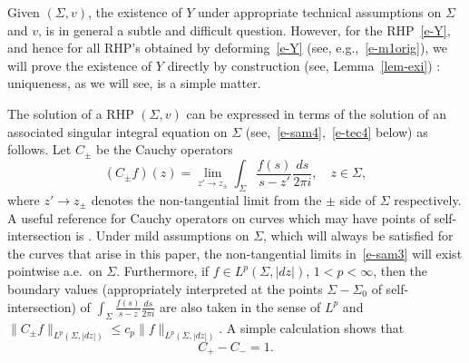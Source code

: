 \documentclass{amsart}
\theoremstyle{definition}
\theoremstyle{remark}
\numberwithin{equation}{section}
\begin{document}
Given $(\Sigma,v)$, the existence of $Y$ under appropriate 
technical assumptions on $\Sigma$ and $v$, is in general 
a subtle and difficult question.
However, for the RHP~\eqref{e-Y}, and hence for all RHP's obtained by 
deforming~\eqref{e-Y} (see, e.g.,~\eqref{e-m1orig}), we will prove the 
existence of $Y$ directly by construction (see, Lemma~\ref{lem-exi}) : 
uniqueness, as we will see, is a simple matter.

The solution of a RHP $(\Sigma, v)$ can be expressed in terms of 
the solution of an associated singular integral equation on $\Sigma$ 
(see,~\eqref{e-sam4},~\eqref{e-tec4} below) as follows.
Let $C_\pm$ be the Cauchy operators
\begin{equation}\label{e-sam3}
   (C_\pm f)(z)=\lim_{z'\to z_\pm} \int_{\Sigma}
\frac{f(s)}{s-z'} \frac{ds}{2\pi i}, \quad z\in\Sigma,
\end{equation}
where $z'\to z_\pm$ denotes the non-tangential limit from the $\pm$ side
of $\Sigma$ respectively.
A useful reference for Cauchy operators on curves which may have points of 
self-intersection is \cite{GK}.
Under mild assumptions on $\Sigma$, which will always be satisfied 
for the curves that arise in this paper, the non-tangential limits 
in~\eqref{e-sam3} will exist pointwise a.e.~on $\Sigma$.
Furthermore, if $f\in L^p(\Sigma,|dz|)$, $1<p<\infty$, then 
the boundary values (appropriately interpreted at the points 
$\Sigma-\Sigma_0$ of self-intersection) 
of $\int_{\Sigma} \frac{f(s)}{s-z} \frac{ds}{2\pi i}$ 
are also taken in the sense of $L^p$ and 
$\|C_\pm f\|_{L^p(\Sigma,|dz|)} \le c_p\|f\|_{L^p(\Sigma,|dz|)}$.
A simple calculation shows that  
\begin{equation}\label{e-tec5}
  C_+-C_-=1.
\end{equation}
\end{document}
